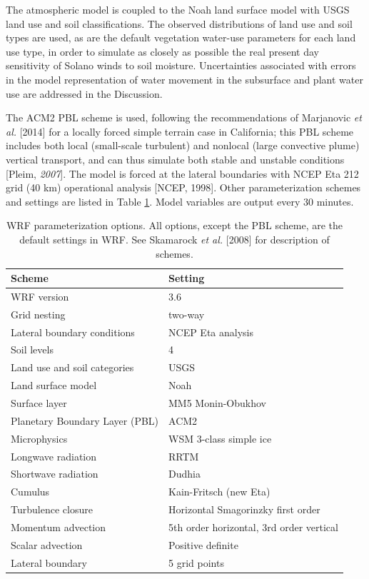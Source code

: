 The atmospheric model is coupled to the Noah land surface model with USGS land use and soil classifications.  The observed distributions of land use and soil types are used, as are the default vegetation water-use parameters for each land use type, in order to simulate as closely as possible the real present day sensitivity of Solano winds to soil moisture.  Uncertainties associated with errors in the model representation of water movement in the subsurface and plant water use are addressed in the Discussion. 

The ACM2 PBL scheme is used, following the recommendations of Marjanovic \textit{et al.} [2014] for a locally forced simple terrain case in California; this PBL scheme includes both local (small-scale turbulent) and nonlocal (large convective plume) vertical transport, and can thus simulate both stable and unstable conditions [Pleim, \textit{2007}].  The model is forced at the lateral boundaries with NCEP Eta 212 grid (40 km) operational analysis [NCEP, 1998].  Other parameterization schemes and settings are listed in Table \ref{table:windSol_paramschemes}.  Model variables are output every 30 minutes.

\begin{table}
\begin{tabular}{l l}
\hline
Scheme & Setting \\ \hline
WRF version & 3.6 \\
Grid nesting & two-way \\
Lateral boundary conditions & NCEP Eta analysis \\
Soil levels & 4 \\
Land use and soil categories & USGS \\
Land surface model & Noah \\
Surface layer & MM5 Monin-Obukhov \\
Planetary Boundary Layer (PBL) & ACM2 \\
Microphysics & WSM 3-class simple ice \\
Longwave radiation & RRTM \\
Shortwave radiation & Dudhia \\
Cumulus & Kain-Fritsch (new Eta) \\
Turbulence closure & Horizontal Smagorinzky first order \\
Momentum advection & 5th order horizontal, 3rd order vertical \\
Scalar advection & Positive definite \\
Lateral boundary & 5 grid points \\
\hline
\end{tabular}
\caption{WRF parameterization options.  All options, except the PBL scheme, are the default settings in WRF.  See Skamarock \textit{et al.} [2008] for description of schemes.}
\label{table:windSol_paramschemes}
\end{table}

